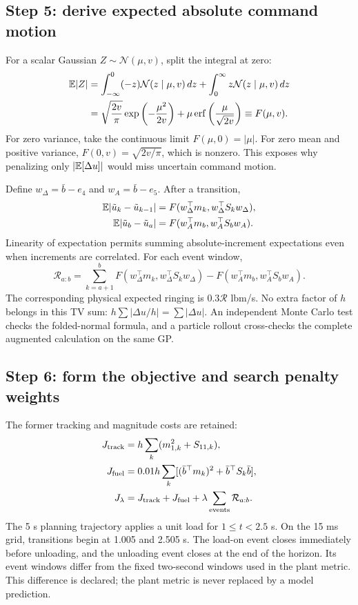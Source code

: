 \subsection{Step 5: derive expected absolute command motion}
For a scalar Gaussian $Z\sim\mathcal N(\mu,v)$, split the integral at zero:
\begin{align}
\mathbb{E}|Z|&=\int_{-\infty}^0(-z)\mathcal N(z\mid\mu,v)\,dz+
\int_0^\infty z\mathcal N(z\mid\mu,v)\,dz\\
&=\sqrt{\frac{2v}{\pi}}\exp\left(-\frac{\mu^2}{2v}\right)+
\mu\operatorname{erf}\left(\frac{\mu}{\sqrt{2v}}\right)
\equiv F(\mu,v).
\end{align}
For zero variance, take the continuous limit $F(\mu,0)=|\mu|$. For zero mean and positive variance, $F(0,v)=\sqrt{2v/\pi}$, which is nonzero. This exposes why penalizing only $|\mathbb{E}[\Delta u]|$ would miss uncertain command motion.

Define $w_\Delta=\bar b-e_4$ and $w_A=\bar b-e_5$. After a transition,
\begin{align}
\mathbb{E}|\tilde u_k-\tilde u_{k-1}|&=F(w_\Delta^\top m_k,w_\Delta^\top S_kw_\Delta),\\
\mathbb{E}|\tilde u_b-\tilde u_a|&=F(w_A^\top m_b,w_A^\top S_bw_A).
\end{align}
Linearity of expectation permits summing absolute-increment expectations even when increments are correlated. For each event window,
\begin{equation}
\mathcal R_{a:b}=\sum_{k=a+1}^{b}F(w_\Delta^\top m_k,w_\Delta^\top S_kw_\Delta)
-F(w_A^\top m_b,w_A^\top S_bw_A).
\end{equation}
The corresponding physical expected ringing is $0.3\mathcal R$ lbm/s. No extra factor of $h$ belongs in this TV sum: $h\sum |\Delta u/h|=\sum|\Delta u|$. An independent Monte Carlo test checks the folded-normal formula, and a particle rollout cross-checks the complete augmented calculation on the same GP.

\subsection{Step 6: form the objective and search penalty weights}
The former tracking and magnitude costs are retained:
\begin{align}
J_{\rm track}&=h\sum_k(m_{1,k}^2+S_{11,k}),\\
J_{\rm fuel}&=0.01h\sum_k[(\bar b^\top m_k)^2+\bar b^\top S_k\bar b],\\
J_\lambda&=J_{\rm track}+J_{\rm fuel}+\lambda\sum_{\rm events}\mathcal R_{a:b}.
\end{align}
The 5 s planning trajectory applies a unit load for $1\le t<2.5$ s. On the 15 ms grid, transitions begin at 1.005 and 2.505 s. The load-on event closes immediately before unloading, and the unloading event closes at the end of the horizon. Its event windows differ from the fixed two-second windows used in the plant metric. This difference is declared; the plant metric is never replaced by a model prediction.

